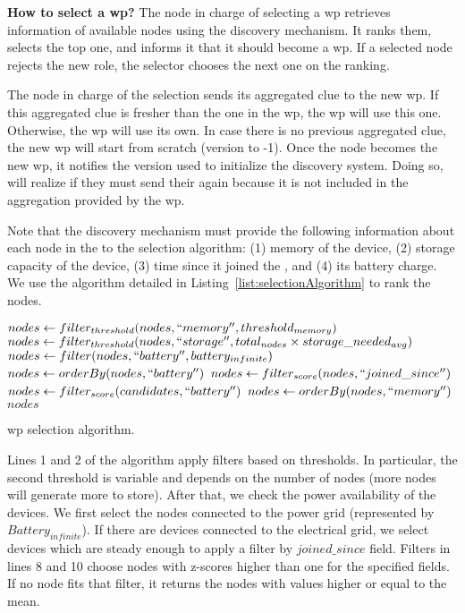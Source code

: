 \noindent\textbf{How to select a \acs{wp}?}
The node in charge of selecting a \ac{wp} retrieves information of available nodes using the discovery mechanism.
It ranks them, selects the top one, and informs it that it should become a \ac{wp}.
If a selected node rejects the new role, the selector chooses the next one on the ranking.

The node in charge of the selection sends its aggregated clue to the new \ac{wp}.
If this aggregated clue is fresher than the one in the \ac{wp}, the \ac{wp} will use this one.
Otherwise, the \ac{wp} will use its own.
In case there is no previous aggregated clue, the new \ac{wp} will start from scratch (version to -1).
Once the node becomes the new \ac{wp}, it notifies the version used to initialize the discovery system.
Doing so, \providers{} will realize if they must send their \clue{} again because it is not included in the aggregation provided by the \ac{wp}.

Note that the discovery mechanism must provide the following information about each node in the \Space{} to the selection algorithm:
(1) memory of the device,
(2) storage capacity of the device,
(3) time since it joined the \Space{}, and %
(4) its battery charge.
We use the algorithm detailed in Listing~\ref{list:selectionAlgorithm} to rank the nodes.

\begin{listing}
  \begin{algorithmic}[1]
  \State $nodes \gets filter_{threshold}(nodes, ``memory'', threshold_{memory})$
  \State $nodes \gets filter_{threshold}(nodes, ``storage'', total_{nodes} \times storage\_needed_{avg})$
    \State $nodes \gets filter(nodes, ``battery'', battery_{infinite})$
    \State $nodes \gets orderBy(nodes, ``battery'')$
  \Else
      \State $nodes \gets filter_{score}(nodes, ``joined\_since'')$
    \EndIf
    \State $nodes \gets filter_{score}(candidates, ``battery'')$
    \State $nodes \gets orderBy(nodes, ``memory'')$
  \EndIf
  \State \Return $nodes$
  \end{algorithmic}
  \caption{\acl{wp} selection algorithm.}
  \label{list:selectionAlgorithm}
\end{listing}

Lines 1 and 2 of the algorithm apply filters based on thresholds.
In particular, the second threshold is variable and depends on the number of nodes (more nodes will generate more \clues{} to store).
After that, we check the power availability of the devices.
We first select the nodes connected to the power grid (represented by $Battery_{infinite}$).
If there are devices connected to the electrical grid, we select devices which are steady enough to apply a filter by $joined\_since$ field.
Filters in lines 8 and 10 choose nodes with z-scores higher than one for the specified fields.
If no node fits that filter, it returns the nodes with values higher or equal to the mean.

